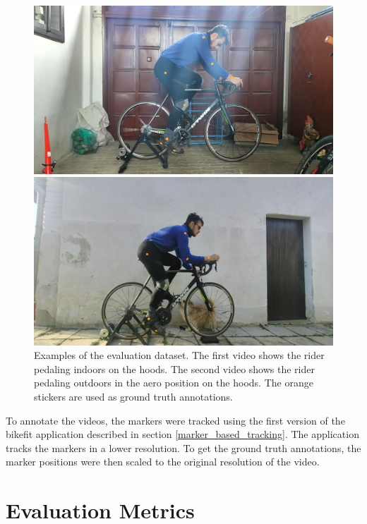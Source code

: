 \begin{figure}[htbp]

    \centering
    \includegraphics[width=1\linewidth]{obrazky-figures/eval_dataset_in_hoods.png}

    \includegraphics[width=1\linewidth]{obrazky-figures/eval_dataset_out_aero.png}

    \caption{Examples of the evaluation dataset. The first video shows the rider pedaling indoors on the hoods. The second video shows the rider pedaling outdoors in the aero position on the hoods. The orange stickers are used as ground truth annotations.}


    \label{fig:evaluation_markers}
\end{figure}

To annotate the videos, the markers were tracked using the first version of the bikefit application described in section \ref{marker_based_tracking}. The application tracks the markers in a lower resolution. To get the ground truth annotations, the marker positions were then scaled to the original resolution of the video.

\section{Evaluation Metrics}
\label{evaluation_metrics}

